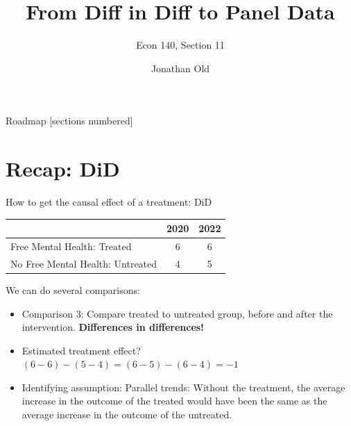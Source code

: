 \documentclass[11pt,xcolor=table]{beamer}
\title{From Diff in Diff to Panel Data
}
\subtitle{Econ 140, Section 11}
\date{}
\author{Jonathan Old}
\begin{document}
\maketitle

\begin{frame}{Roadmap}
  [sections numbered]
  \tableofcontents%
\end{frame}







\section{Recap: DiD}





\begin{frame}{How to get the causal effect of a treatment: DiD}


\begin{table}[]
\begin{tabular}{lcc}
\toprule
\textbf{}                        & \textbf{2020} & \textbf{2022} \\ \midrule
Free Mental Health: Treated      &    6       & 6          \\ \midrule
No Free Mental Health: Untreated &    4       & 5        \\ \bottomrule
\end{tabular}
\end{table}

We can do several comparisons:
\begin{itemize}[<+- | alert@+>]
\item Comparison 3: Compare treated to untreated group, before and after the intervention. \textbf{Differences in differences!}
\item Estimated treatment effect? $(6-6)-(5-4)=(6-5)-(6-4)=-1$
\item Identifying assumption: Parallel trends: Without the treatment, the average increase in the outcome of the treated would have been the same as the average increase in the outcome of the untreated.
\end{itemize} 
\end{frame}
\end{document}

